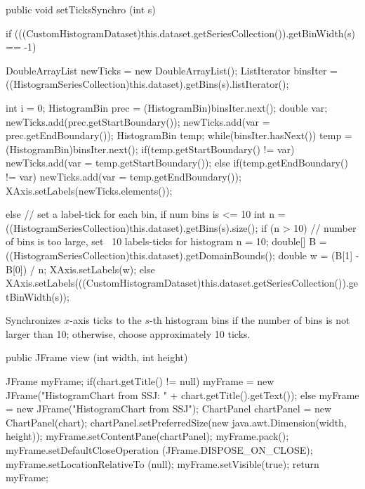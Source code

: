 \begin{code}

   public void setTicksSynchro (int s) \begin{hide} {
      if (((CustomHistogramDataset)this.dataset.getSeriesCollection()).getBinWidth(s) == -1){
         DoubleArrayList newTicks = new DoubleArrayList();
         ListIterator binsIter = ((HistogramSeriesCollection)this.dataset).getBins(s).listIterator();

         int i = 0;
         HistogramBin prec = (HistogramBin)binsIter.next();
         double var;
         newTicks.add(prec.getStartBoundary());
         newTicks.add(var = prec.getEndBoundary());
         HistogramBin temp;
         while(binsIter.hasNext()) {
            temp = (HistogramBin)binsIter.next();
            if(temp.getStartBoundary() != var) {
               newTicks.add(var = temp.getStartBoundary());
            } else if(temp.getEndBoundary() != var) {
               newTicks.add(var = temp.getEndBoundary());
            }
         }
         XAxis.setLabels(newTicks.elements());
      }
      else {
         // set a label-tick for each bin, if num bins is <= 10
         int n = ((HistogramSeriesCollection)this.dataset).getBins(s).size();
         if (n > 10) {
            // number of bins is too large, set ~10 labels-ticks for histogram
            n = 10;
            double[] B = ((HistogramSeriesCollection)this.dataset).getDomainBounds();
            double w = (B[1] - B[0]) / n;
            XAxis.setLabels(w);
         } else {
            XAxis.setLabels(((CustomHistogramDataset)this.dataset.getSeriesCollection()).getBinWidth(s));
         }
      }
   }\end{hide}
\end{code}
\begin{tabb}
   Synchronizes $x$-axis ticks to the $s$-th histogram bins if the number
   of bins is not larger than 10;
   otherwise, choose approximately 10 ticks.
\end{tabb}
\begin{htmlonly}
\end{htmlonly}
\begin{code}

   public JFrame view (int width, int height) \begin{hide} {
      JFrame myFrame;
      if(chart.getTitle() != null)
         myFrame = new JFrame("HistogramChart from SSJ: " + chart.getTitle().getText());
      else
         myFrame = new JFrame("HistogramChart from SSJ");
      ChartPanel chartPanel = new ChartPanel(chart);
      chartPanel.setPreferredSize(new java.awt.Dimension(width, height));
      myFrame.setContentPane(chartPanel);
      myFrame.pack();
      myFrame.setDefaultCloseOperation (JFrame.DISPOSE_ON_CLOSE);
      myFrame.setLocationRelativeTo (null);
      myFrame.setVisible(true);
      return myFrame;
   }\end{hide}
\end{code}
